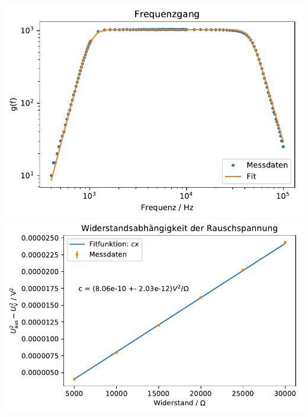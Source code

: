 \documentclass[a4paper]{article}
\begin{document}
  \vspace*{70pt}
  \centering
    \includegraphics{Frequenzgang.pdf}\\
  \vspace*{50pt}
    \includegraphics{Widerstand.pdf}
\end{document}
